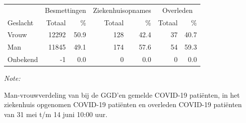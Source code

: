 \documentclass[
  english,
  man,floatsintext]{apa6}
\begin{document}
\begin{table}
\centering\begingroup\fontsize{11}{13}\selectfont

\begin{threeparttable}
\begin{tabular}{lrrrrrr}
\toprule
\multicolumn{1}{c}{ } & \multicolumn{2}{c}{Besmettingen} & \multicolumn{2}{c}{Ziekenhuisopnames} & \multicolumn{2}{c}{Overleden} \\
\cmidrule(l{3pt}r{3pt}){2-3} \cmidrule(l{3pt}r{3pt}){4-5} \cmidrule(l{3pt}r{3pt}){6-7}
Geslacht & Totaal & \% & Totaal & \% & Totaal & \%\\
\midrule
Vrouw & 12292 & 50.9 & 128 & 42.4 & 37 & 40.7\\
Man & 11845 & 49.1 & 174 & 57.6 & 54 & 59.3\\
Onbekend & -1 & 0.0 & 0 & 0.0 & 0 & 0.0\\
\bottomrule
\end{tabular}
\begin{tablenotes}
\item \textit{Note: } 
\item Man-vrouwverdeling van bij de GGD’en gemelde COVID-19 patiënten, in het ziekenhuis opgenomen COVID-19 patiënten en overleden COVID-19 patiënten van 31 mei t/m 14 juni 10:00 uur.
\end{tablenotes}
\end{threeparttable}
\endgroup{}
\end{table}
\newpage
\end{document}
